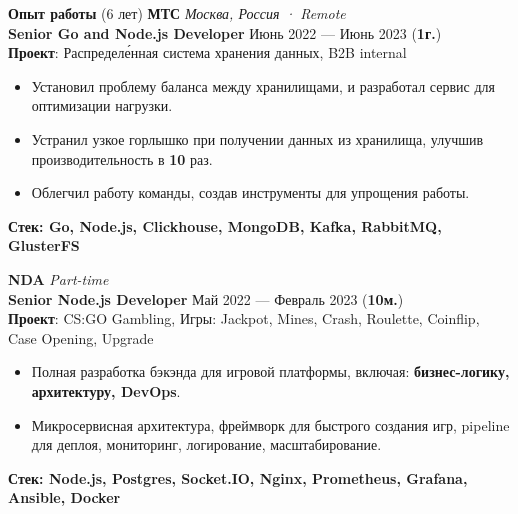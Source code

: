 \documentclass{resume}
\begin{document}
\begin{rSection}{\textbf{Опыт работы} (6 лет) }
    \textbf{МТС} \hfill \textit{Москва, Россия · Remote} \\
    \textbf{Senior Go and Node.js Developer}  \hfill Июнь 2022 --- Июнь 2023 ({\textbf{1г.}}) \\
    \textbf{Проект}: Распределе́нная система хранения данных, B2B internal
    \begin{itemize}
        \item Установил проблему баланса между хранилищами, и разработал сервис для оптимизации нагрузки.
        \item Устранил узкое горлышко при получении данных из хранилища, улучшив производительность в \textbf{10} раз\@.
        \item Облегчил работу команды, создав инструменты для упрощения работы\@.
    \end{itemize}
    \textbf{Стек: Go, Node.js, Clickhouse, MongoDB, Kafka, RabbitMQ, GlusterFS}

    \textbf{NDA} \hfill \textit{Part-time} \\
    \textbf{Senior Node.js Developer}  \hfill Май 2022 --- Февраль 2023 ({\textbf{10м.}}) \\
    \textbf{Проект}: CS:GO Gambling, Игры: Jackpot, Mines, Crash, Roulette, Coinflip, Case Opening, Upgrade
    \begin{itemize}
        \item Полная разработка бэкэнда для игровой платформы, включая: \textbf{бизнес-логику, архитектуру, DevOps}\@.
        \item Микросервисная архитектура, фреймворк для быстрого создания игр, pipeline для деплоя, мониторинг, логирование, масштабирование\@.
    \end{itemize}
    \textbf{Стек: Node.js, Postgres, Socket.IO, Nginx, Prometheus, Grafana, Ansible, Docker}


\end{rSection}
\end{document}
